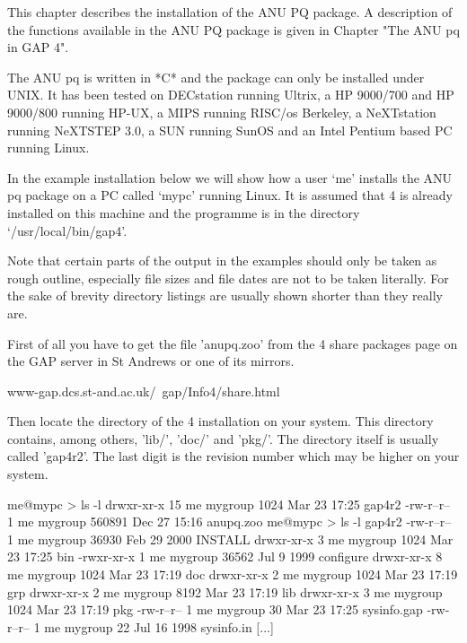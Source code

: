 
This  chapter  describes  the  installation  of the  ANU  PQ  package.  A
description of the functions available in  the ANU PQ package is given in
Chapter "The ANU pq in GAP 4".

The ANU pq is written in *C*  and the package can only be installed under
UNIX.  It has been tested on DECstation running Ultrix, a HP 9000/700 and
HP 9000/800 running HP-UX, a MIPS running RISC/os Berkeley, a NeXTstation
running NeXTSTEP 3.0,  a SUN running SunOS and an  Intel Pentium based PC
running Linux.

In the example  installation below we will show how  a user `me' installs
the ANU  pq package on a PC  called `mypc' running Linux.   It is assumed
that  {\GAP}  4 is  already  installed on  this  machine  and the  {\GAP}
programme is in the directory `/usr/local/bin/gap4'.

Note that  certain parts  of the  output in the  examples should  only be
taken as rough  outline, especially file sizes and file  dates are not to
be  taken literally.   For the  sake  of brevity  directory listings  are
usually shown shorter than they really are.

First of all you have to get the file 'anupq.zoo' from the {\GAP} 4 share
packages page on the GAP server in St Andrews or one of its mirrors.

\begintt
        www-gap.dcs.st-and.ac.uk/~gap/Info4/share.html
\endtt

Then locate  the {\GAP}  directory of the  {\GAP} 4 installation  on your
system.   This  directory  contains,  among others,  'lib/',  'doc/'  and
'pkg/'.   The {\GAP} directory  itself is  usually called  'gap4r2'.  The
last digit is the revision number which may be higher on your system.

\begintt
    me@mypc > ls -l
    drwxr-xr-x   15 me   mygroup         1024 Mar 23 17:25 gap4r2
    -rw-r--r--   1  me   mygroup       560891 Dec 27 15:16 anupq.zoo
    me@mypc > ls -l gap4r2
    -rw-r--r--    1 me   mygroup        36930 Feb 29  2000 INSTALL
    drwxr-xr-x    3 me   mygroup         1024 Mar 23 17:25 bin
    -rwxr-xr-x    1 me   mygroup        36562 Jul  9  1999 configure
    drwxr-xr-x    8 me   mygroup         1024 Mar 23 17:19 doc
    drwxr-xr-x    2 me   mygroup         1024 Mar 23 17:19 grp
    drwxr-xr-x    2 me   mygroup         8192 Mar 23 17:19 lib
    drwxr-xr-x    3 me   mygroup         1024 Mar 23 17:19 pkg
    -rw-r--r--    1 me   mygroup           30 Mar 23 17:25 sysinfo.gap
    -rw-r--r--    1 me   mygroup           22 Jul 16  1998 sysinfo.in
    [...]
\endtt

